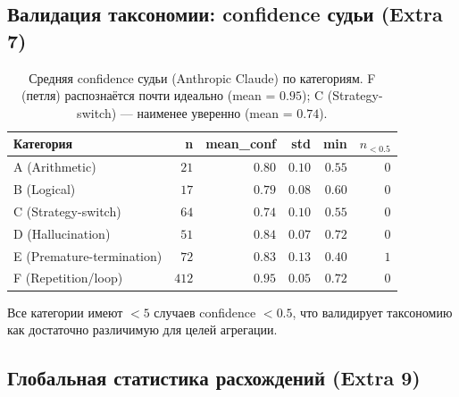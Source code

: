 \documentclass[11pt, a4paper]{article}
\begin{document}
\subsection{Валидация таксономии: confidence судьи (Extra 7)}

\begin{table}[H]
\centering
\small
\begin{tabular}{lrrrrr}
\toprule
\textbf{Категория} & \textbf{n} & \textbf{mean\_conf} & \textbf{std} & \textbf{min} & \textbf{$n_{<0.5}$} \\
\midrule
A (Arithmetic)             & $21$  & $0.80$ & $0.10$ & $0.55$ & $0$ \\
B (Logical)                & $17$  & $0.79$ & $0.08$ & $0.60$ & $0$ \\
C (Strategy-switch)        & $64$  & $0.74$ & $0.10$ & $0.55$ & $0$ \\
D (Hallucination)          & $51$  & $0.84$ & $0.07$ & $0.72$ & $0$ \\
E (Premature-termination)  & $72$  & $0.83$ & $0.13$ & $0.40$ & $1$ \\
F (Repetition/loop)        & $412$ & $\mathbf{0.95}$ & $0.05$ & $0.72$ & $0$ \\
\bottomrule
\end{tabular}
\caption{Средняя confidence судьи (Anthropic Claude) по категориям.
F (петля) распознаётся почти идеально (mean = $0.95$); C
(Strategy-switch) — наименее уверенно (mean = $0.74$).}
\label{tab:judge-confidence}
\end{table}

Все категории имеют $< 5$ случаев confidence $< 0.5$, что валидирует
таксономию как достаточно различимую для целей агрегации.

\subsection{Глобальная статистика расхождений (Extra 9)}
\end{document}
